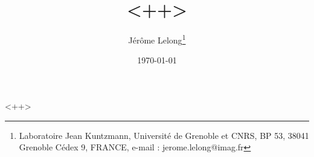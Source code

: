 \documentclass[a4paper,11pt,twoside]{article}
\title{<++>}
\date{\today}
\author{J\'er\^ome Lelong\footnote{Laboratoire Jean Kuntzmann, Universit\'e de
    Grenoble et CNRS, BP 53, 38041 Grenoble C\'edex 9, FRANCE, 
    e-mail : jerome.lelong@imag.fr}}
\begin{document}
\maketitle
<++>
\end{document}

